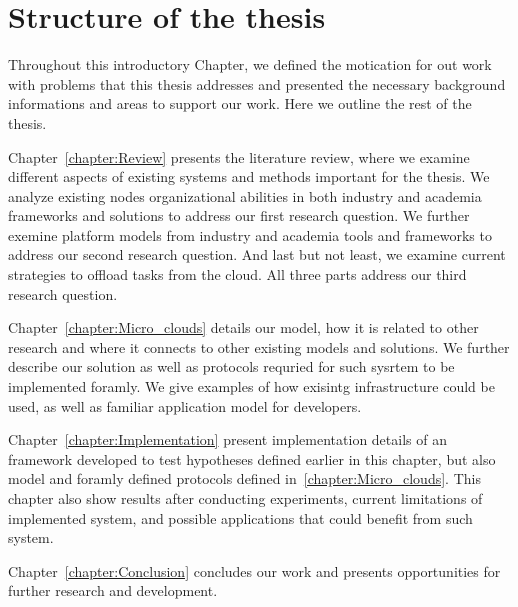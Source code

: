 \section{Structure of the thesis}\label{sec:structure_of_thesis}
%
Throughout this introductory Chapter, we defined the motication for out work with problems that this thesis addresses and presented the necessary background informations and areas to support our work. Here we outline the rest of the thesis.

Chapter~\ref{chapter:Review} presents the literature review, where we examine different aspects of existing systems and methods important for the thesis. We analyze existing nodes organizational abilities in both industry and academia frameworks and solutions to address our first research question. We further exemine platform models from industry and academia tools and frameworks to address our second research question. And last but not least, we examine current strategies to offload tasks from the cloud. All three parts address our third research question.

Chapter~\ref{chapter:Micro_clouds} details our model, how it is related to other research and where it connects to other existing models and solutions. We further describe our solution as well as protocols requried for such sysrtem to be implemented foramly. We give examples of how exisintg infrastructure could be used, as well as familiar application model for developers. 

Chapter~\ref{chapter:Implementation} present implementation details of an framework developed to test hypotheses defined earlier in this chapter, but also model and foramly defined protocols defined in~\ref{chapter:Micro_clouds}. This chapter also show results after conducting experiments, current limitations of implemented system, and possible applications that could benefit from such system.

Chapter~\ref{chapter:Conclusion} concludes our work and presents opportunities for further research and development.
%
%